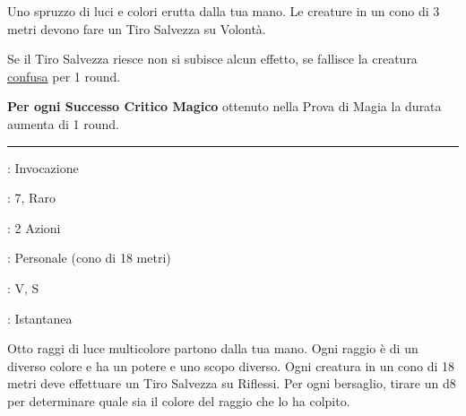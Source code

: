 \begin{multicols}{2}
Uno spruzzo di luci e colori erutta dalla tua mano. Le creature in un cono di 3 metri devono fare un Tiro Salvezza su Volontà.

Se il Tiro Salvezza riesce non si subisce alcun effetto, se fallisce la creatura \hyperlink{confusionecondizione}{confusa} per 1 round.

\textbf{Per ogni Successo Critico Magico} ottenuto nella Prova di Magia la durata aumenta di 1 round.

\smallskip\noindent\rule{\linewidth}{2pt} \hypertarget{Spruzzo Prismatico}{}\medskip{}
\noindent
\begin{description}[noitemsep, topsep=0pt, parsep=0pt, partopsep=0pt, leftmargin=0cm, labelwidth=2.8cm]
	\item[\textbf{Lista di Magia}]: Invocazione
	\item[\textbf{Livello}]: 7, Raro
	\item[\textbf{T. di Lancio}]: 2 Azioni
	\item[\textbf{Gittata}]: Personale (cono di 18 metri)
	\item[\textbf{Componenti}]: V, S
	\item[\textbf{Durata}]: Istantanea
\end{description}

Otto raggi di luce multicolore partono dalla tua mano. Ogni raggio è di un diverso colore e ha un potere e uno scopo diverso. Ogni creatura in un cono di 18 metri deve effettuare un Tiro Salvezza su Riflessi. Per ogni bersaglio, tirare un d8 per determinare quale sia il colore del raggio che lo ha colpito.


\end{multicols}
